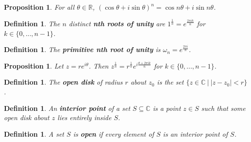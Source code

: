 \documentclass{article}
\theoremstyle{colontheorem}
\newtheorem{proposition}[theorem]{Proposition}
\newtheorem{definition}[theorem]{Definition}
\newenvironment{Proposition}
{
	\begin{mdframed}[backgroundcolor=TheoremOrange!10]
	\begin{proposition}
}
{
	\end{proposition}
	\end{mdframed}
	
	\vspace{.15in}
}
\newenvironment{Def}
{
	\begin{mdframed}[backgroundcolor=DefGreen!10]
	\begin{definition}
}
{
	\end{definition}
	\end{mdframed}
	
	\vspace{.15in}
}
\begin{document}
\begin{Proposition}
	
	For all $\theta \in \mathbb{R}$, $(\cos \theta + i \sin \theta)^n = \cos n\theta + i \sin n\theta$.
	
\end{Proposition}



\begin{Def}
	
	The $n$ distinct \textbf{\textit{n}th roots of unity} are $1^{\frac{1}{n}} = e^{\frac{2\pi i k}{n}}$ for $k \in \{0, ..., n-1\}$.
	
\end{Def}



\begin{Def}
	
	The \textbf{primitive \textit{n}th root of unity} is $\omega_n = e^{\frac{2\pi i}{n}}$.
	
\end{Def}



\begin{Proposition}
	
	Let $z = re^{i\theta}$. Then $z^{\frac{1}{n}} = r^{\frac{1}{n}} e^{i \frac{\theta + 2\pi i k}{n}}$ for $k \in \{0, ..., n-1\}$.
	
\end{Proposition}



\begin{Def}
	
	The \textbf{open disk} of radius $r$ about $z_0$ is the set $\{z \in \mathbb{C}\ |\ |z - z_0| < r\}$.
	
\end{Def}



\begin{Def}
	
	An \textbf{interior point} of a set $S \subseteq \mathbb{C}$ is a point $z \in S$ such that some open disk about $z$ lies entirely inside $S$.
	
\end{Def}



\begin{Def}
	
	A set $S$ is \textbf{open} if every element of $S$ is an interior point of $S$.
	
\end{Def}
\end{document}
